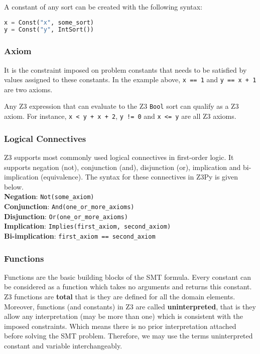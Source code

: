 A constant of any sort can be created with the following syntax:

\begin{lstlisting}[language=python]
x = Const("x", some_sort)
y = Const("y", IntSort())
\end{lstlisting}

\subsubsection{Axiom}
It is the constraint imposed on problem constants that needs to be satisfied by values assigned to these constants. In the example above, \lstinline|x == 1| and \lstinline|y == x + 1| are two axioms.

Any Z3 expression that can evaluate to the Z3 \lstinline|Bool| sort can qualify as a Z3 axiom. For instance, \lstinline|x < y + x + 2|, \lstinline|y != 0| and \lstinline|x <= y| are all Z3 axioms.


\subsubsection{Logical Connectives}
Z3 supports most commonly used logical connectives in first-order logic. It supports negation (not), conjunction (and), disjunction (or), implication and bi-implication (equivalence). The syntax for these connectives in Z3Py is given below.\\
\textbf{Negation}: \lstinline|Not(some_axiom)|\\
\textbf{Conjunction}: \lstinline|And(one_or_more_axioms)|\\
\textbf{Disjunction}: \lstinline|Or(one_or_more_axioms)|\\
\textbf{Implication}: \lstinline|Implies(first_axiom, second_axiom)|\\
\textbf{Bi-implication}: \lstinline|first_axiom == second_axiom|\\


\subsubsection{Functions}
Functions are the basic building blocks of the SMT formula. Every constant can be considered as a function which takes no arguments and returns this constant.
Z3 functions are \textbf{total} that is they are defined for all the domain elements. Moreover, functions (and constants) in Z3 are called \textbf{uninterpreted}, that is they allow any interpretation (may be more than one) which is consistent with the imposed constraints. Which means there is no prior interpretation attached before solving the SMT problem. Therefore, we may use the terms uninterpreted constant and variable interchangeably.

